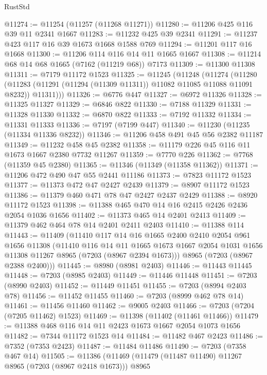 \begin{lexlean}{RustStd}
\begin{coremodule}
@11274 := @11254 (@11257 (@11268 @11271))
@11280 := @11206 @425 @116 @39 @11 @2341 @1667
@11283 := @11232 @425 @39 @2341
@11291 := @11237 @423 @117 @16 @39 @1673 @1668 @1588 @769
@11294 := @11201 @117 @16 @1668
@11300 := @11206 @114 @116 @14 @11 @1665 @1667
@11308 := @11214 @68 @14 @68 @1665 (@7162 (@11219 @68)) @7173
@11309 := @11300 @11308
@11311 := @7179 @11172 @1523
@11325 := @11245
    (@11248
      (@11274
        (@11280
          (@11283 (@11291 (@11294 (@11309 @11311)) @11082 @11085 @11088 @11091 @8232))
          @11311)))
@11326 := @6776 @447
@11327 := @6972 @11326
@11328 := @11325 @11327
@11329 := @6846 @822
@11330 := @7188 @11329
@11331 := @11328 @11330
@11332 := @6870 @822
@11333 := @7192 @11332
@11334 := @11331 @11333
@11336 := @7197 (@7199 @447)
@11340 := @11230 (@11235 (@11334 @11336 @8232))
@11346 := @11206 @458 @491 @45 @56 @2382 @11187
@11349 := @11232 @458 @45 @2382
@11358 := @11179 @226 @45 @116 @11 @1673 @1667 @2380 @7732 @11267
@11359 := @7770 @226
@11362 := @7768 (@11359 @45 @2380)
@11365 := @11346 (@11349 (@11358 @11362))
@11371 := @11206 @472 @490 @47 @55 @2441 @11186
@11373 := @7823 @11172 @1523
@11377 := @11373 @472 @47 @2427 @2439
@11379 := @8907 @11172 @1523
@11386 := @11379 @460 @471 @78 @47 @2427 @2437 @2429
@11388 := @8920 @11172 @1523
@11398 := @11388 @465 @470 @14 @16 @2415 @2426 @2436 @2054 @1036 @1656
@11402 := @11373 @465 @14 @2401 @2413
@11409 := @11379 @462 @464 @78 @14 @2401 @2411 @2403
@11410 := @11388 @114
@11443 := @11409
    (@11410
      @117
      @14
      @16
      @1665
      @2400
      @2410
      @2054
      @961
      @1656
      @11308
      (@11410
        @116
        @14
        @11
        @1665
        @1673
        @1667
        @2054
        @1031
        @1656
        @11308
        @11267
        @8965
        (@7203 (@8967 @2394 @1673)))
      @8965
      (@7203 (@8967 @2388 @2400)))
@11445 := @8980 (@8981 @2403)
@11446 := @11443 @11445
@11448 := @7203 (@8985 @2403)
@11449 := @11446 @11448
@11451 := @7203 (@8990 @2403)
@11452 := @11449 @11451
@11455 := @7203 (@8994 @2403 @78)
@11456 := @11452 @11455
@11460 := @7203 (@8999 @462 @78 @14)
@11461 := @11456 @11460
@11462 := @9005 @2403
@11466 := @7203 (@7204 (@7205 @11462) @1523)
@11469 := @11398 (@11402 (@11461 @11466))
@11479 := @11388 @468 @116 @14 @11 @2423 @1673 @1667 @2054 @1073 @1656
@11482 := @7344 @11172 @1523 @14
@11484 := @11482 @467 @2423
@11486 := @7352 (@7353 @2423)
@11487 := @11484 @11486
@11490 := @7203 (@7358 @467 @14)
@11505 := @11386
    (@11469
      (@11479 (@11487 @11490) @11267 @8965 (@7203 (@8967 @2418 @1673)))
      @8965

\end{coremodule}
\end{lexlean}

